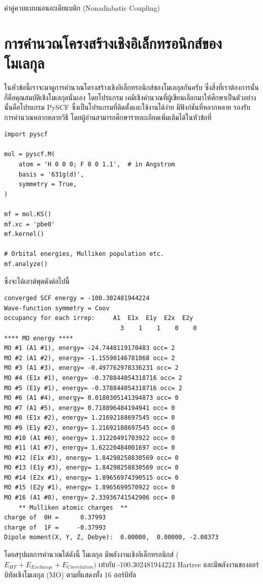 ค่าคู่ควบแบบนอนอะเดียแบติก (Nonadiabatic Coupling)

\section{การคำนวณโครงสร้างเชิงอิเล็กทรอนิกส์ของโมเลกุล}
\label{sec:comp_elec_strct}

ในหัวข้อนี้เราจะมาดูการคำนวณโครงสร้างเชิงอิเล็กทรอนิกส์ของโมเลกุลกันครับ ซึ่งสิ่งที่เราต้องการนั้นก็คือคุณสมบัติเชิงโมเลกุลนั่นเอง โดยโปรแกรม%
เคมีเชิงคำนวณที่ผู้เขียนเลือกมาให้ศึกษาเป็นตัวอย่างนั้นคือโปรแกรม PySCF ซึ่งเป็นโปรแกรมที่ติดตั้งและใช้งานได้ง่าย มีฟังก์ชันที่หลากหลาย รองรับ%
การคำนวณหลากหลายวิธี โดยผู้อ่านสามารถศึกษารายละเอียดเพิ่มเติมได้ในหัวข้อที่ 

\begin{lstlisting}[style=MyPython]
import pyscf

mol = pyscf.M(
    atom = 'H 0 0 0; F 0 0 1.1',  # in Angstrom
    basis = '631g(d)',
    symmetry = True,
)

mf = mol.KS()
mf.xc = 'pbe0'
mf.kernel()

# Orbital energies, Mulliken population etc.
mf.analyze()
\end{lstlisting}

\noindent ซึ่งจะได้เอาต์พุตดังต่อไปนี้

\begin{lstlisting}[style=plain]
converged SCF energy = -100.302481944224
Wave-function symmetry = Coov
occupancy for each irrep:     A1  E1x  E1y  E2x  E2y
                                3    1    1    0    0
**** MO energy ****
MO #1 (A1 #1), energy= -24.7448119170483 occ= 2
MO #2 (A1 #2), energy= -1.15590146781068 occ= 2
MO #3 (A1 #3), energy= -0.497762978336231 occ= 2
MO #4 (E1x #1), energy= -0.378844054318716 occ= 2
MO #5 (E1y #1), energy= -0.378844054318716 occ= 2
MO #6 (A1 #4), energy= 0.0180305141394873 occ= 0
MO #7 (A1 #5), energy= 0.718896484194941 occ= 0
MO #8 (E1x #2), energy= 1.21692188697545 occ= 0
MO #9 (E1y #2), energy= 1.21692188697545 occ= 0
MO #10 (A1 #6), energy= 1.31220491703922 occ= 0
MO #11 (A1 #7), energy= 1.62220484001697 occ= 0
MO #12 (E1x #3), energy= 1.84298258830569 occ= 0
MO #13 (E1y #3), energy= 1.84298258830569 occ= 0
MO #14 (E2x #1), energy= 1.89656974390515 occ= 0
MO #15 (E2y #1), energy= 1.8965699570922 occ= 0
MO #16 (A1 #8), energy= 2.33936741542906 occ= 0
    ** Mulliken atomic charges  **
charge of  0H =      0.37993
charge of  1F =     -0.37993
Dipole moment(X, Y, Z, Debye):  0.00000,  0.00000, -2.08373
\end{lstlisting}

โดยสรุปผลการคำนวณได้ดังนี้ โมเลกุล  มีพลังงานเชิงอิเล็กทรอนิกส์ ($E_{HF} + E_{Exchange} + E_{Correlation})$ เท่ากับ 
-100.302481944224 Hartree และมีพลังงานของออร์บิทัลเชิงโมเลกุล (MO) ตามที่แสดงทั้ง 16 ออร์บิทัล
